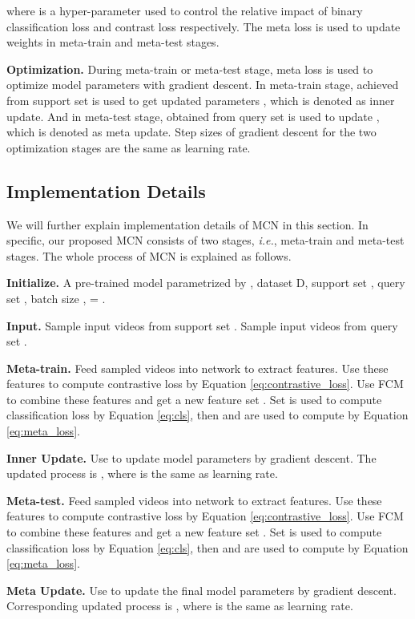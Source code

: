 \documentclass[10pt,twocolumn,letterpaper]{article}
\begin{document}
\noindent where  is a hyper-parameter used to control the relative impact of binary classification loss  and contrast loss  respectively. The meta loss is used to update weights in meta-train and meta-test stages.

\textbf{Optimization.} During meta-train or meta-test stage, meta loss  is used to optimize model parameters  with gradient descent. In meta-train stage,  achieved from support set is used to get updated parameters , which is denoted as inner update. And in meta-test stage,  obtained from query set is used to update , which is denoted as meta update. Step sizes of gradient descent for the two optimization stages are the same as learning rate.
    
\subsection{Implementation Details}
\label{implementation}
We will further explain implementation details of MCN in this section. In specific, our proposed MCN consists of two stages, \textit{i.e.}, meta-train and meta-test stages. The whole process of MCN is explained as follows.

\textbf{Initialize.} A pre-trained model  parametrized by , dataset D, support set , query set , batch size ,  =   . 

\textbf{Input.} Sample  input videos  from support set . Sample  input videos  from query set .

\textbf{Meta-train.} Feed sampled videos  into network  to extract features. Use these features to compute contrastive loss  by Equation \ref{eq:contrastive_loss}. Use FCM to combine these features and get a new feature set . Set  is used to compute classification loss  by Equation \ref{eq:cls}, then  and  are used to compute  by Equation \ref{eq:meta_loss}.

\textbf{Inner Update.} Use  to update model parameters by gradient descent. The updated process is   , where  is the same as learning rate.

\textbf{Meta-test.} Feed sampled videos  into network  to extract features. Use these features to compute contrastive loss  by Equation \ref{eq:contrastive_loss}. Use FCM to combine these features and get a new feature set . Set  is used to compute classification loss  by Equation \ref{eq:cls}, then  and  are used to compute  by Equation \ref{eq:meta_loss}.

\textbf{Meta Update.} Use  to update the final model parameters by gradient descent. Corresponding updated process is   , where  is the same as learning rate. 
\end{document}
